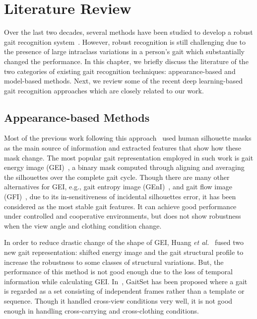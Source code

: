 \chapter{Literature Review} \label{ch:literature_review}
Over the last two decades, several methods have been studied to develop a robust gait recognition system~\cite{Rida_19}. However, robust recognition is still challenging due to the presence of large intraclass variations in a person's gait which substantially changed the performance. In this chapter, we briefly discuss the literature of the two categories of existing gait recognition techniques: appearance-based and model-based methods.
 Next, we review some of the recent deep learning-based gait recognition approaches which are closely related to our work. 


\section{Appearance-based Methods} \label{sec:appearance_based_methods}
Most of the previous work following this approach~\cite{Han_06, Bashir_09, Lam_11} used human silhouette masks as the main source of information and extracted features that show how these mask change. The most popular gait representation employed in such work is gait energy image (GEI)~\cite{Han_06}, a binary mask computed through aligning and averaging the silhouettes over the complete gait cycle. Though there are many other alternatives for GEI, e.g., gait entropy image (GEnI)~\cite{Bashir_09}, and gait flow image (GFI)~\cite{Lam_11}, due to its in-sensitiveness of incidental silhouettes error, it has been considered as the most stable gait features.  It can achieve good performance under controlled and cooperative environments, but does not show robustness when the view angle and clothing condition change. 

In order to reduce drastic change of the shape of GEI, Huang \textit{et al.}~\cite{Huang_12} fused two new gait representation: shifted energy image and the gait structural profile to increase the robustness to some classes of structural variations. But, the performance of this method is not good enough due to the loss of temporal information while calculating GEI. In~\cite{Chao_19}, GaitSet has been proposed where a gait is regarded as a set consisting of independent frames rather than a template or sequence. Though it handled cross-view conditions very well, it is not good enough in handling cross-carrying and cross-clothing conditions. 

